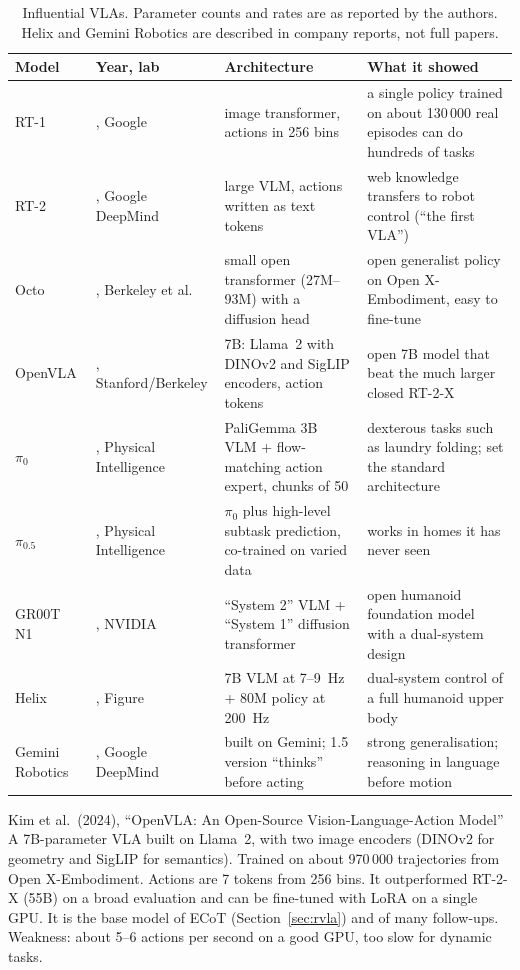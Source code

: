 \begin{table}[h]
\centering\small
\begin{tabularx}{\linewidth}{@{}l >{\raggedright\arraybackslash}p{2.4cm} >{\raggedright\arraybackslash}X >{\raggedright\arraybackslash}X@{}}
\toprule
Model & Year, lab & Architecture & What it showed \\
\midrule
RT-1 & 2022, Google & image transformer, actions in 256 bins & a single policy trained on about 130\,000 real episodes can do hundreds of tasks \\
RT-2 & 2023, Google DeepMind & large VLM, actions written as text tokens & web knowledge transfers to robot control (``the first VLA'') \\
Octo & 2024, Berkeley et al. & small open transformer (27M--93M) with a diffusion head & open generalist policy on Open X-Embodiment, easy to fine-tune \\
OpenVLA & 2024, Stanford/Berkeley & 7B: Llama~2 with DINOv2 and SigLIP encoders, action tokens & open 7B model that beat the much larger closed RT-2-X \\
$\pi_0$ & 2024, Physical Intelligence & PaliGemma 3B VLM + flow-matching action expert, chunks of 50 & dexterous tasks such as laundry folding; set the standard architecture \\
$\pi_{0.5}$ & 2025, Physical Intelligence & $\pi_0$ plus high-level subtask prediction, co-trained on varied data & works in homes it has never seen \\
GR00T N1 & 2025, NVIDIA & ``System 2'' VLM + ``System 1'' diffusion transformer & open humanoid foundation model with a dual-system design \\
Helix & 2025, Figure & 7B VLM at 7--9~Hz + 80M policy at 200~Hz & dual-system control of a full humanoid upper body \\
Gemini Robotics & 2025, Google DeepMind & built on Gemini; 1.5 version ``thinks'' before acting & strong generalisation; reasoning in language before motion \\
\bottomrule
\end{tabularx}
\caption{Influential VLAs. Parameter counts and rates are as reported by the authors. Helix and Gemini Robotics are described in company reports, not full papers.}
\label{tab:vla}
\end{table}

\begin{paperbox}{Kim et al.\ (2024), ``OpenVLA: An Open-Source Vision-Language-Action Model''}
A 7B-parameter VLA built on Llama~2, with two image encoders (DINOv2 for geometry and SigLIP for semantics). Trained on about 970\,000 trajectories from Open X-Embodiment. Actions are 7 tokens from 256 bins. It outperformed RT-2-X (55B) on a broad evaluation and can be fine-tuned with LoRA on a single GPU. It is the base model of ECoT (Section~\ref{sec:rvla}) and of many follow-ups. Weakness: about 5--6 actions per second on a good GPU, too slow for dynamic tasks.
\end{paperbox}

